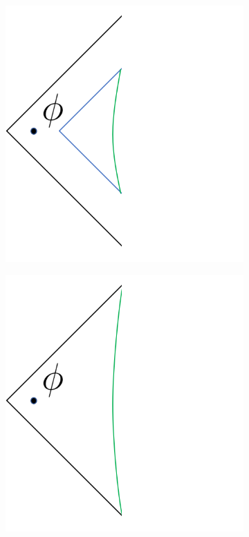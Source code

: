 \documentclass[11pt,a4paper]{article}
\begin{document}
\begin{figure} [t]
\centering
\begin{subfigure}{.48\textwidth}
  \centering
 \includegraphics[width = 0.8\linewidth]{SYK_Untuned.png}
 \caption{}
 \label{fig:sykuntuned}
\end{subfigure}
\begin{subfigure}{.48\textwidth}
 \includegraphics[width = 0.8\linewidth]{SYK_Tuned.png}
 \centering
 \caption{}
 \label{fig:syktuned}

\end{subfigure}
\end{figure}
\end{document}
